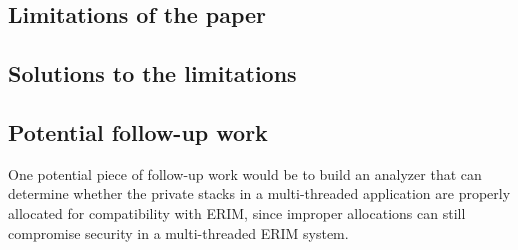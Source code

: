 \documentclass[11pt]{article}
\begin{document}
\subsection*{Limitations of the paper}

\subsection*{Solutions to the limitations}

\subsection*{Potential follow-up work}

One potential piece of follow-up work would be to build an analyzer that can determine whether the private stacks in a multi-threaded application are properly allocated for compatibility with ERIM, since improper allocations can still compromise security in a multi-threaded ERIM system.
\end{document}

